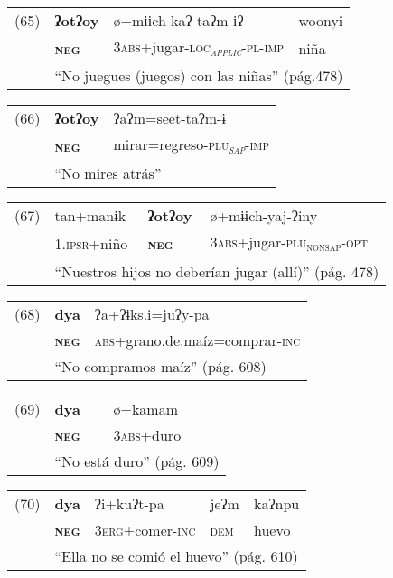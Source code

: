 {\setmainfont{Charis SIL} 

\begin{tabular}{llll}
(65) & \textbf{ʔotʔoy} & ø+mɨɨch-kaʔ-taʔm-ɨʔ & woonyi \\
& \textsc{\textbf{neg}} & \textsc{3abs}+jugar-\textsc{loc\textsubscript{\emph{applic}}-pl-imp} & niña \\
& \multicolumn{3}{l}{``No juegues (juegos) con las niñas'' (pág.478)}
\end{tabular} \vspace{0.5cm}

\begin{tabular}{lll}
(66) & \textbf{ʔotʔoy} & ʔaʔm=seet-taʔm-ɨ \\
& \textsc{\textbf{neg}} & mirar=regreso-\textsc{plu\textsubscript{\emph{sap}}-imp} \\
& \multicolumn{2}{l}{``No mires atrás''}
\end{tabular} \vspace{0.5cm}

\begin{tabular}{llll}
(67) & tan+manɨk & \textbf{ʔotʔoy} & ø+mɨɨch-yaj-ʔiny \\
& 1.\textsc{ipsr+}niño & \textsc{\textbf{neg}} & \textsc{3abs+}jugar-\textsc{plu\textsubscript{nonsap}-opt} \\
& \multicolumn{3}{l}{``Nuestros hijos no deberían jugar (allí)'' (pág. 478)}
\end{tabular} \vspace{0.5cm}

\begin{tabular}{lll}
(68) & \textbf{dya} & ʔa+ʔɨks.i=juʔy-pa \\
& \textsc{\textbf{neg}} & \textsc{abs}+grano.de.maíz=comprar-\textsc{inc} \\
& \multicolumn{2}{l}{``No compramos maíz'' (pág. 608)}
\end{tabular} \vspace{0.5cm}

\begin{tabular}{lll}
(69) &  \textbf{dya} & ø+kamam \\
& \textsc{\textbf{neg}} & \textsc{3abs+}duro \\
& \multicolumn{2}{l}{``No está duro'' (pág. 609)}
\end{tabular} \vspace{0.5cm}

\begin{tabular}{lllll}
(70) & \textbf{dya} & ʔi+kuʔt-pa & jeʔm & kaʔnpu \\
& \textsc{\textbf{neg}} & \textsc{3erg}+comer-\textsc{inc} & \textsc{dem} & huevo \\
& \multicolumn{4}{l}{``Ella no se comió el huevo'' (pág. 610)}
\end{tabular} \vspace{0.5cm}

}

